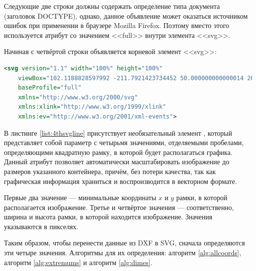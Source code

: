 Следующие две строки должны содержать определение типа документа (заголовок DOCTYPE), однако, данное объявление может оказаться источником ошибок при применении в браузере Mozilla Firefox. Поэтому вместо этого используется атрибут  со значением <<full>> внутри элемента <<svg>>.

Начиная с четвёртой строки объявляется корневой элемент <<svg>>:

\begin{lstlisting}[language=XML,caption={Первая строка SVG-файлов},label=list:4thsvgline]
	<svg version="1.1" width="100%" height="100%"
	viewBox="102.1188828597992 -211.7921423734452 50.000000000000014 26.0"
	baseProfile="full"
	xmlns="http://www.w3.org/2000/svg"
	xmlns:xlink="http://www.w3.org/1999/xlink"
	xmlns:ev="http://www.w3.org/2001/xml-events">
\end{lstlisting}

В листинге \ref{list:4thsvgline} присутствует необязательный элемент , который представляет собой параметр с четырьмя значениями, отделяемыми пробелами, определяющими квадратную рамку, в которой будет располагаться графика. Данный атрибут позволяет автоматически масштабировать изображение до размеров указанного контейнера, причём, без потери качества, так как графическая информация храниться и воспроизводится в векторном формате.

Первые два значение --- минимальные координаты $x$ и $y$ рамки, в которой располагается изображение. Третье и четвёртое значения --- соответственно, ширина и высота рамки, в которой находится изображение. Значения указываются в пикселях.

Таким образом, чтобы перенести данные из DXF в SVG, сначала определяются эти четыре значения. Алгоритмы для их определения: алгоритм \ref{alg:allcoords}, алгоритм \ref{alg:extremums} и алгоритм \ref{alg:dimes}.

